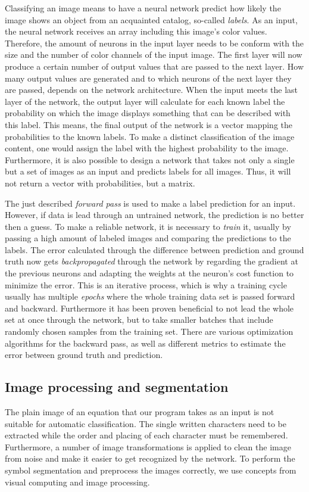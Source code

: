 \documentclass[12pt]{article}
\begin{document}
	Classifying an image means to have a neural network predict how likely the image shows an object from an acquainted catalog, so-called \textit{labels}. As an input, the neural network receives an array including this image's color values. Therefore, the amount of neurons in the input layer needs to be conform with the size and the number of color channels of the input image. The first layer will now produce a certain number of output values that are passed to the next layer. How many output values are generated and to which neurons of the next layer they are passed, depends on the network architecture. When the input meets the last layer of the network, the output layer will calculate for each known label the probability on which the image displays something that can be described with this label. This means, the final output of the network is a vector mapping the probabilities to the known labels. To make a distinct classification of the image content, one would assign the label with the highest probability to the image. Furthermore, it is also possible to design a network that takes not only a single but a set of images as an input and predicts labels for all images. Thus, it will not return a vector with probabilities, but a matrix.
	
	The just described \textit{forward pass} is used to make a label prediction for an input. However, if data is lead through an untrained network, the prediction is no better then a guess. To make a reliable network, it is necessary to \textit{train} it, usually by passing a high amount of labeled images and comparing the predictions to the labels. The error calculated through the difference between prediction and ground truth now gets \textit{backpropagated} through the network by regarding the gradient at the previous neurons and adapting the weights at the neuron's cost function to minimize the error. This is an iterative process, which is why a training cycle usually has multiple \textit{epochs} where the whole training data set is passed forward and backward. Furthermore it has been proven beneficial to not lead the whole set at once through the network, but to take smaller batches that include randomly chosen samples from the training set. There are various optimization algorithms for the backward pass, as well as different metrics to estimate the error between ground truth and prediction.

	\subsection{Image processing and segmentation}
	The plain image of an equation that our program takes as an input is not suitable for automatic classification. The single written characters need to be extracted while the order and placing of each character must be remembered. Furthermore, a number of image transformations is applied to clean the image from noise and make it easier to get recognized by the network. To perform the symbol segmentation and preprocess the images correctly, we use concepts from visual computing and image processing.	
	
\end{document}
